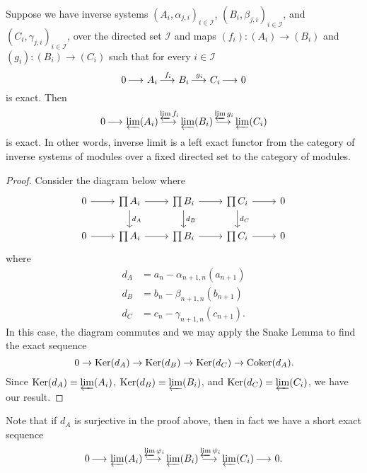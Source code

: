 \documentclass{ximera}
\begin{document}
\begin{proposition} \label{invlimleftexact}
Suppose we have inverse systems $(A_i,\alpha_{j,i})_{i \in \mathcal{I}}$,
$(B_i,\beta_{j,i})_{i \in \mathcal{I}}$, and $(C_i,\gamma_{j,i})_{i \in
  \mathcal{I}}$, over the directed set $\mathcal{I}$ and maps
$(f_i):(A_i) \to (B_i)$ and $(g_i):(B_i)
\to (C_i)$ such that for every $i \in \mathcal{I}$
\[
0 \mathop{\longrightarrow\,}\limits A_i \mathop{\longrightarrow\,}\limits^{f_i} B_i \mathop{\longrightarrow\,}\limits^{g_i} C_i\mathop{\longrightarrow\,}\limits 0
\]
is exact.  Then
\[
0 \mathop{\longrightarrow\,}\limits \varprojlim(A_i) \mathop{\longrightarrow\,}\limits^{\varprojlim f_i} \varprojlim(B_i) \mathop{\longrightarrow\,}\limits^{\varprojlim g_i} \varprojlim(C_i)
\]
is exact.  In other words, inverse limit is a left exact functor from
the category of inverse systems of modules over a fixed directed set
to the category of modules.
\begin{proof}
  Consider the diagram below where
  \[
  \begin{tikzcd}
    0 \ar[r] & \prod A_i  \ar[r]  \ar[d,"d_A"] &   \prod B_i \ar[r]  \ar[d,"d_B"] &  \prod C_i  \ar[r] \ar[d,"d_C"] & 0\\
    0 \ar[r] & \prod A_i  \ar[r]  &   \prod B_i \ar[r]  &  \prod C_i  \ar[r] & 0
  \end{tikzcd}
  \]
  where
  \begin{align*}
    d_A &= a_n-\alpha_{n+1,n}(a_{n+1})\\
    d_B &= b_n-\beta_{n+1,n}(b_{n+1})\\
    d_C &= c_n-\gamma_{n+1,n}(c_{n+1}).
  \end{align*}
  In this case, the diagram commutes and we may apply the 
  Snake Lemma to find the exact sequence
  \[
  0 \to \mathop{\mathrm{Ker}}\nolimits(d_A) \to \mathop{\mathrm{Ker}}\nolimits(d_B) \to \mathop{\mathrm{Ker}}\nolimits(d_C) \to \mathop{\mathrm{Coker}}\nolimits(d_A).
  \]
  Since $\mathop{\mathrm{Ker}}\nolimits(d_A) = \varprojlim(A_i)$, $\mathop{\mathrm{Ker}}\nolimits(d_B) = \varprojlim(B_i)$, and
  $\mathop{\mathrm{Ker}}\nolimits(d_C) = \varprojlim(C_i)$, we have our result.
\end{proof}
\end{proposition}

\begin{remark}
  Note that if $d_A$ is surjective in the proof above, then in fact we
  have a short exact sequence
  \[
  0 \mathop{\longrightarrow\,}\limits \varprojlim(A_i) \mathop{\longrightarrow\,}\limits^{\varprojlim \varphi_i} \varprojlim(B_i) \mathop{\longrightarrow\,}\limits^{\varprojlim \psi_i} \varprojlim(C_i) \mathop{\longrightarrow\,}\limits 0.
  \]
\end{remark}
\end{document}
